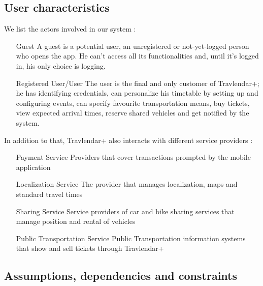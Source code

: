 			
	\subsection{User characteristics}

	We list the actors involved in our system :
	
	\begin{enumerate}
	
		\item[Guest] A guest is a potential user, an unregistered or not-yet-logged person who opens the app. He can't access all its functionalities and, until it's logged in, his only choice is logging.
		
		\item[Registered User/User] The user is the final and only customer of Travlendar+; he has identifying credentials, can personalize his timetable by setting up and configuring events, can specify favourite transportation means, buy tickets, view expected arrival times, reserve shared vehicles and get notified by the system.

	\end{enumerate}
	
In addition to that, Travlendar+ also interacts with different service providers :
	
	\begin{enumerate}
	
		
		\item[Payment Service] Providers that cover transactions prompted by the mobile application
		\item[Localization Service] The provider that manages localization, maps and standard travel times 
		\item[Sharing Service] Service providers of car and bike sharing services that manage position and rental of vehicles
		\item[Public Transportation Service] Public Transportation information systems that show and sell tickets through Travlendar+
	
	\end{enumerate}
		
	\subsection{Assumptions, dependencies and constraints}
